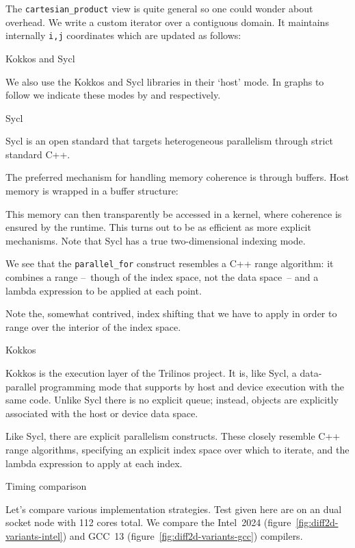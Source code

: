 The \lstinline{cartesian_product} view is quite general
so one could wonder about overhead.
We write a custom iterator over a contiguous domain.
It maintains internally \lstinline{i,j} coordinates
which are updated as follows:
%

 {Kokkos and Sycl}

We also use the Kokkos and Sycl libraries in their `host' mode.
In graphs to follow we indicate these modes
by  and  respectively.

 {Sycl}

Sycl is an open standard that targets
heterogeneous parallelism through strict standard C++.

The preferred mechanism for handling memory coherence is through buffers.
Host memory is wrapped in a buffer structure:

This memory can then transparently be accessed in a kernel, where
coherence is ensured by the runtime.
This turns out to be as efficient as more explicit mechanisms.
%
%
Note that Sycl has a true two-dimensional indexing mode.

We see that the \lstinline{parallel_for} construct
resembles a C++ range algorithm: it combines
a range --~though of the index space, not the data space~--
and a lambda expression to be applied at each point.

Note the, somewhat contrived, index shifting that we have to apply
in order to range over the interior of the index space.

 {Kokkos}

Kokkos is the execution layer of the Trilinos project.
It is, like Sycl, a data-parallel programming mode
that supports by host and device execution with the same code.
Unlike Sycl there is no explicit queue; instead,
objects are explicitly associated with the host or device data space.


Like Sycl, there are explicit parallelism constructs.
These closely resemble C++ range algorithms,
specifying an explicit index space over which to iterate,
and the lambda expression to apply at each index.


 {Timing comparison}

Let's compare various implementation strategies.
Test given here are on an 
dual socket node with 112 cores total.
We compare the Intel~2024 (figure~\ref{fig:diff2d-variants-intel})
and GCC~13 (figure~\ref{fig:diff2d-variants-gcc})
compilers.

